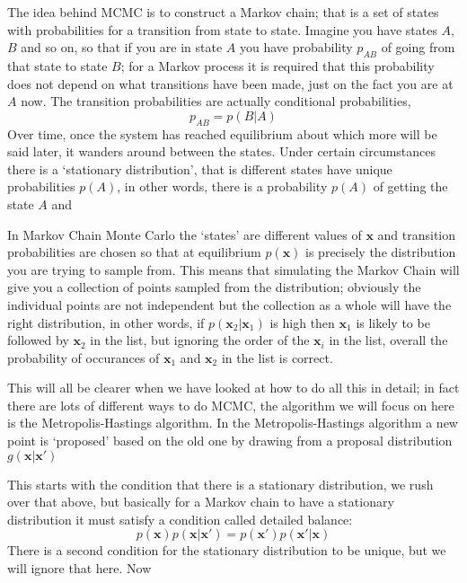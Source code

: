 \documentclass[11pt,a4paper]{scrartcl}
\begin{document}
The idea behind MCMC is to construct a Markov chain; that is a set of
states with probabilities for a transition from state to
state. Imagine you have states $A$, $B$ and so on, so that if you are
in state $A$ you have probability $p_{AB}$ of going from that state to
state $B$; for a Markov process it is required that this probability
does not depend on what transitions have been made, just on the fact
you are at $A$ now. The transition probabilities are actually conditional probabilities, 
\begin{equation}
p_{AB}=p(B|A)
\end{equation}
Over time, once the system has reached equilibrium about which more
will be said later, it wanders around between the states. Under
certain circumstances there is a \lq{}stationary distribution\rq{},
that is different states have unique probabilities $p(A)$, in other
words, there is a probability $p(A)$ of getting the state $A$ and 

In Markov Chain Monte Carlo the \lq{}states\rq{} are different values
of $\mathbf{x}$ and transition probabilities are chosen so that at
equilibrium $p(\textbf{x})$ is precisely the distribution you are
trying to sample from. This means that simulating the Markov Chain
will give you a collection of points sampled from the distribution;
obviously the individual points are not independent but the collection
as a whole will have the right distribution, in other words, if
$p(\textbf{x}_2|\textbf{x}_1)$ is high then $\textbf{x}_1$ is likely
to be followed by $\textbf{x}_2$ in the list, but ignoring the order
of the $\textbf{x}_i$ in the list, overall the probability of
occurances of $\textbf{x}_1$ and $\textbf{x}_2$ in the list is
correct.

This will all be clearer when we have looked at how to do all this in
detail; in fact there are lots of different ways to do MCMC, the
algorithm we will focus on here is the Metropolis-Hastings
algorithm. In the Metropolis-Hastings algorithm a new point is
\lq{}proposed\rq{} based on the old one by drawing from a proposal
distribution $g(\textbf{x}|\textbf{x}')$



This starts with the condition that there is a stationary
distribution, we rush over that above, but basically for a Markov
chain to have a stationary distribution it must satisfy a condition called detailed balance:
\begin{equation}
p(\mathbf{x})p(\mathbf{x}|\mathbf{x}')=p(\mathbf{x}')p(\mathbf{x}'|\mathbf{x})
\end{equation}
There is a second condition for the stationary distribution to be
unique, but we will ignore that here. Now
\end{document}
